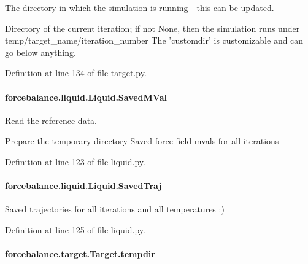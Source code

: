 The directory in which the simulation is running -\/ this can be updated. 

Directory of the current iteration; if not None, then the simulation runs under temp/target\-\_\-name/iteration\-\_\-number The 'customdir' is customizable and can go below anything.

Definition at line 134 of file target.\-py.

\hypertarget{classforcebalance_1_1liquid_1_1Liquid_a5b9df1bf79a641156429e292f47b6afd}{
\paragraph[{Saved\-M\-Val}]{\setlength{\rightskip}{0pt plus 5cm}forcebalance.\-liquid.\-Liquid.\-Saved\-M\-Val\hspace{0.3cm}{\ttfamily [inherited]}}}\label{classforcebalance_1_1liquid_1_1Liquid_a5b9df1bf79a641156429e292f47b6afd}


Read the reference data. 

Prepare the temporary directory Saved force field mvals for all iterations 

Definition at line 123 of file liquid.\-py.

\hypertarget{classforcebalance_1_1liquid_1_1Liquid_a0da0c00cdc193c9c470d7e528043fb99}{
\paragraph[{Saved\-Traj}]{\setlength{\rightskip}{0pt plus 5cm}forcebalance.\-liquid.\-Liquid.\-Saved\-Traj\hspace{0.3cm}{\ttfamily [inherited]}}}\label{classforcebalance_1_1liquid_1_1Liquid_a0da0c00cdc193c9c470d7e528043fb99}


Saved trajectories for all iterations and all temperatures \-:) 



Definition at line 125 of file liquid.\-py.

\hypertarget{classforcebalance_1_1target_1_1Target_aa1f01b5b78db253b5b66384ed11ed193}{
\paragraph[{tempdir}]{\setlength{\rightskip}{0pt plus 5cm}forcebalance.\-target.\-Target.\-tempdir\hspace{0.3cm}{\ttfamily [inherited]}}}\label{classforcebalance_1_1target_1_1Target_aa1f01b5b78db253b5b66384ed11ed193}


